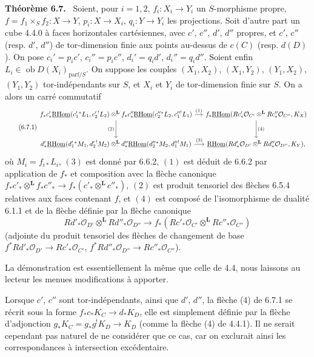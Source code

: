 \documentclass[11pt]{article}
\providecommand{\cO}{\mathcal{O}}
\newenvironment{statement}[1]{\par\medskip\noindent\textbf{#1.}\ }{\par\medskip}
\providecommand{\RHom}{\mathrm{RHom}}
\providecommand{\uRHom}{\underline{\RHom}}
\providecommand{\RHom}{\mathrm{RHom}}
\providecommand{\RHom}{\mathrm R\mathcal{H}om}
\providecommand{\RHom}{\mathrm{RHom}}
\begin{document}
\begin{statement}{Théorème 6.7}
Soient, pour $i=1,2$, $f_i:X_i\to Y_i$ un $S$-morphisme propre, $f=f_1\times_Sf_2:X\to Y$, $p_i:X\to X_i$, $q_i:Y\to Y_i$ les projections. Soit d'autre part un cube 4.4.0 à faces horizontales cartésiennes, avec $c'$, $c''$, $d'$, $d''$ propres, et $c'$, $c''$ (resp. $d'$, $d''$) de tor-dimension finie aux points au-dessus de $c(C)$ (resp. $d(D)$). On pose $c_i'=p_ic'$, $c_i''=p_ic''$, $d_i'=q_id'$, $d_i''=q_id''$. Soient enfin $L_i\in\operatorname{ob}D(X_i)_{\mathrm{parf}/S}$. On suppose les couples $(X_1,X_2)$, $(X_1,Y_2)$, $(Y_1,X_2)$, $(Y_1,Y_2)$ tor-indépendants sur $S$, et $X_i$ et $Y_i$ de tor-dimension finie sur $S$. On a alors un carré commutatif
\begin{equation}
\tag{6.7.1}
\begin{tikzcd}[column sep=small,row sep=large]
f_*c'_*\uRHom(c_1'{}^*L_1,c_2'{}^!L_2)\otimes^{\mathbf L} f_*c''_*\uRHom(c_2''{}^*L_2,c_1''{}^!L_1) \arrow[r,"(1)"] \arrow[d,"(2)"']
& f_*\uRHom(Rc'_*\cO_{C'}\otimes^{\mathbf L}Rc''_*\cO_{C''},K_X) \arrow[d,"(4)"] \\
d'_*\uRHom(d_1'{}^*M_1,d_2'{}^!M_2)\otimes^{\mathbf L} d''_*\uRHom(d_2''{}^*M_2,d_1''{}^!M_1) \arrow[r,"(3)"]
& \uRHom(Rd'_*\cO_{D'}\otimes^{\mathbf L}Rd''_*\cO_{D''},K_Y),
\end{tikzcd}
\end{equation}
où $M_i=f_{i*}L_i$, $(3)$ est donné par 6.6.2, $(1)$ est déduit de 6.6.2 par application de $f_*$ et composition avec la flèche canonique $f_*c'_*\otimes^{\mathbf L} f_*c''_*\to f_*(c'_*\otimes^{\mathbf L} c''_*)$, $(2)$ est produit tensoriel des flèches 6.5.4 relatives aux faces contenant $f$, et $(4)$ est composé de l'isomorphisme de dualité 6.1.1 et de la flèche définie par la flèche canonique
\[
Rd'_*\cO_{D'}\otimes^{\mathbf L}Rd''_*\cO_{D''}\longrightarrow f_*(Rc'_*\cO_{C'}\otimes^{\mathbf L}Rc''_*\cO_{C''})
\]
(adjointe du produit tensoriel des flèches de changement de base $f^*Rd'_*\cO_{D'}\to Rc'_*\cO_{C'}$, $f^*Rd''_*\cO_{D''}\to Rc''_*\cO_{C''}$).
\end{statement}

La démonstration est essentiellement la même que celle de 4.4, nous laissons au lecteur les menues modifications à apporter.

Lorsque $c'$, $c''$ sont tor-indépendants, ainsi que $d'$, $d''$, la flèche (4) de 6.7.1 se récrit sous la forme $f_*c_*K_C\to d_*K_D$, elle est simplement définie par la flèche d'adjonction $g_*K_C=g_*g^!K_D\to K_D$ (comme la flèche (4) de 4.4.1). Il ne serait cependant pas naturel de ne considérer que ce cas, car on exclurait ainsi les correspondances à intersection excédentaire.
\end{document}
